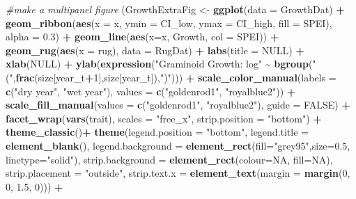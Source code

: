 \documentclass[
]{article}
\newenvironment{Shaded}{\begin{snugshade}}{\end{snugshade}}
\newcommand{\CommentTok}[1]{\textcolor[rgb]{0.56,0.35,0.01}{\textit{#1}}}
\newcommand{\DataTypeTok}[1]{\textcolor[rgb]{0.13,0.29,0.53}{#1}}
\newcommand{\DecValTok}[1]{\textcolor[rgb]{0.00,0.00,0.81}{#1}}
\newcommand{\FloatTok}[1]{\textcolor[rgb]{0.00,0.00,0.81}{#1}}
\newcommand{\KeywordTok}[1]{\textcolor[rgb]{0.13,0.29,0.53}{\textbf{#1}}}
\newcommand{\NormalTok}[1]{#1}
\newcommand{\OperatorTok}[1]{\textcolor[rgb]{0.81,0.36,0.00}{\textbf{#1}}}
\newcommand{\OtherTok}[1]{\textcolor[rgb]{0.56,0.35,0.01}{#1}}
\newcommand{\StringTok}[1]{\textcolor[rgb]{0.31,0.60,0.02}{#1}}
\begin{document}
\begin{Shaded}
\begin{Highlighting}[]
\CommentTok{\#make a multipanel figure}
\NormalTok{(GrowthExtraFig \textless{}{-}}\StringTok{ }\KeywordTok{ggplot}\NormalTok{(}\DataTypeTok{data =}\NormalTok{ GrowthDat) }\OperatorTok{+}
\StringTok{  }\KeywordTok{geom\_ribbon}\NormalTok{(}\KeywordTok{aes}\NormalTok{(}\DataTypeTok{x =}\NormalTok{ x, }\DataTypeTok{ymin =}\NormalTok{ CI\_low, }\DataTypeTok{ymax =}\NormalTok{ CI\_high, }\DataTypeTok{fill =}\NormalTok{ SPEI), }\DataTypeTok{alpha =} \FloatTok{0.3}\NormalTok{) }\OperatorTok{+}
\StringTok{  }\KeywordTok{geom\_line}\NormalTok{(}\KeywordTok{aes}\NormalTok{(}\DataTypeTok{x=}\NormalTok{x, Growth, }\DataTypeTok{col =}\NormalTok{ SPEI))  }\OperatorTok{+}\StringTok{ }
\StringTok{  }\KeywordTok{geom\_rug}\NormalTok{(}\KeywordTok{aes}\NormalTok{(}\DataTypeTok{x =}\NormalTok{ rug), }\DataTypeTok{data =}\NormalTok{ RugDat) }\OperatorTok{+}
\StringTok{  }\KeywordTok{labs}\NormalTok{(}\DataTypeTok{title =} \OtherTok{NULL}\NormalTok{) }\OperatorTok{+}
\StringTok{  }\KeywordTok{xlab}\NormalTok{(}\OtherTok{NULL}\NormalTok{) }\OperatorTok{+}
\StringTok{  }\KeywordTok{ylab}\NormalTok{(}\KeywordTok{expression}\NormalTok{(}\StringTok{"Graminoid Growth: log"} \OperatorTok{\textasciitilde{}}\StringTok{ }\KeywordTok{bgroup}\NormalTok{(}\StringTok{"("}\NormalTok{,}\KeywordTok{frac}\NormalTok{(size[year\_t}\OperatorTok{+}\DecValTok{1}\NormalTok{],size[year\_t]),}\StringTok{")"}\NormalTok{)))  }\OperatorTok{+}
\StringTok{  }\KeywordTok{scale\_color\_manual}\NormalTok{(}\DataTypeTok{labels =} \KeywordTok{c}\NormalTok{(}\StringTok{"dry year"}\NormalTok{, }\StringTok{"wet year"}\NormalTok{), }\DataTypeTok{values =} \KeywordTok{c}\NormalTok{(}\StringTok{"goldenrod1"}\NormalTok{, }\StringTok{"royalblue2"}\NormalTok{)) }\OperatorTok{+}
\StringTok{  }\KeywordTok{scale\_fill\_manual}\NormalTok{(}\DataTypeTok{values =} \KeywordTok{c}\NormalTok{(}\StringTok{"goldenrod1"}\NormalTok{, }\StringTok{"royalblue2"}\NormalTok{), }\DataTypeTok{guide =} \OtherTok{FALSE}\NormalTok{) }\OperatorTok{+}
\StringTok{  }\KeywordTok{facet\_wrap}\NormalTok{(}\KeywordTok{vars}\NormalTok{(trait), }\DataTypeTok{scales =} \StringTok{"free\_x"}\NormalTok{, }\DataTypeTok{strip.position =}  \StringTok{"bottom"}\NormalTok{) }\OperatorTok{+}
\StringTok{  }\KeywordTok{theme\_classic}\NormalTok{()}\OperatorTok{+}
\StringTok{  }\KeywordTok{theme}\NormalTok{(}\DataTypeTok{legend.position =} \StringTok{"bottom"}\NormalTok{, }\DataTypeTok{legend.title =} \KeywordTok{element\_blank}\NormalTok{(), }\DataTypeTok{legend.background =} \KeywordTok{element\_rect}\NormalTok{(}\DataTypeTok{fill=}\StringTok{"grey95"}\NormalTok{,}\DataTypeTok{size=}\FloatTok{0.5}\NormalTok{, }\DataTypeTok{linetype=}\StringTok{"solid"}\NormalTok{), }\DataTypeTok{strip.background =} \KeywordTok{element\_rect}\NormalTok{(}\DataTypeTok{colour=}\OtherTok{NA}\NormalTok{, }\DataTypeTok{fill=}\OtherTok{NA}\NormalTok{), }\DataTypeTok{strip.placement =} \StringTok{"outside"}\NormalTok{, }\DataTypeTok{strip.text.x =} \KeywordTok{element\_text}\NormalTok{(}\DataTypeTok{margin =} \KeywordTok{margin}\NormalTok{(}\DecValTok{0}\NormalTok{, }\DecValTok{0}\NormalTok{, }\FloatTok{1.5}\NormalTok{, }\DecValTok{0}\NormalTok{))) }\OperatorTok{+}

\end{Highlighting}
\end{Shaded}
\end{document}

